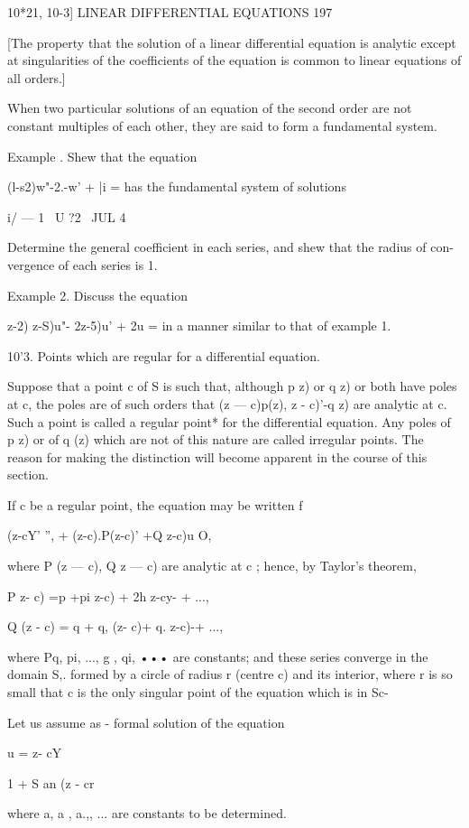 10*21, 10-3] LINEAR DIFFERENTIAL EQUATIONS 197

[The property that the solution of a linear differential equation is
analytic except at singularities of the coefficients of the equation
is common to linear equations of all orders.]

When two particular solutions of an equation of the second order are
not constant multiples of each other, they are said to form a
fundamental system.

Example . Shew that the equation

(l-s2)w"-2.-w' + |i = has the fundamental system of solutions

i/ — 1 \ U ?2 \ JUL 4 \

Determine the general coefficient in each series, and shew that the
radius of con- vergence of each series is 1.

Example 2. Discuss the equation

 z-2) z-S)u"- 2z-5)u' + 2u = in a manner similar to that of example 1.

10'3. Points which are regular for a differential equation.

Suppose that a point c of S is such that, although p z) or q z) or
both have poles at c, the poles are of such orders that (z — c)p(z), z
- c)'-q z) are analytic at c. Such a point is called a regular point*
for the differential equation. Any poles of p z) or of q (z) which are
not of this nature are called irregular points. The reason for making
the distinction will become apparent in the course of this section.

If c be a regular point, the equation may be written f

(z-cY' '', + (z-c).P(z-c)' +Q z-c)u O,

where P (z — c), Q z — c) are analytic at c ; hence, by Taylor's
theorem,

P z- c) =p +pi z-c) + 2h z-cy- + ...,

Q (z - c) = q + q, (z- c)+ q. z-c)-+ ...,

where Pq, pi, ..., g , qi, ••• are constants; and these series
converge in the domain S,. formed by a circle of radius r (centre c)
and its interior, where r is so small that c is the only singular
point of the equation which is in Sc-

Let us assume as - formal solution of the equation

u = z- cY

1 + S an (z - cr

where a, a , a.,, ... are constants to be determined.

